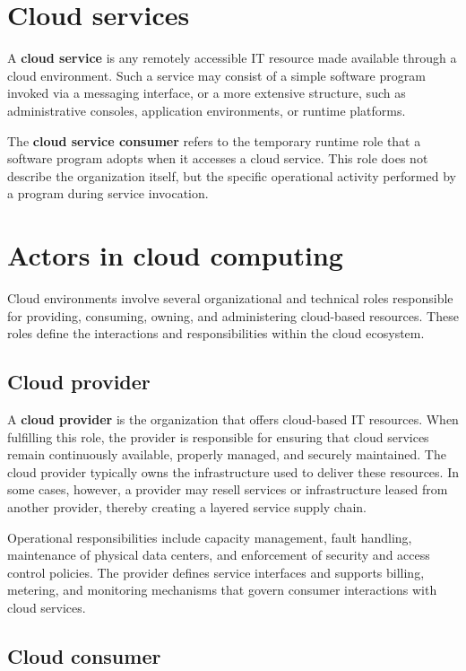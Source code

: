\documentclass[11pt,a4paper,openany]{report}
\begin{document}
\section{Cloud services}

A \textbf{cloud service} is any remotely accessible IT resource made available through a cloud environment. Such a service may consist of a simple software program invoked via a messaging interface, or a more extensive structure, such as administrative consoles, application environments, or runtime platforms.

The \textbf{cloud service consumer} refers to the temporary runtime role that a software program adopts when it accesses a cloud service. This role does not describe the organization itself, but the specific operational activity performed by a program during service invocation.

\section{Actors in cloud computing}

Cloud environments involve several organizational and technical roles responsible for providing, consuming, owning, and administering cloud-based resources. These roles define the interactions and responsibilities within the cloud ecosystem.

\subsection{Cloud provider}

A \textbf{cloud provider} is the organization that offers cloud-based IT resources. When fulfilling this role, the provider is responsible for ensuring that cloud services remain continuously available, properly managed, and securely maintained. The cloud provider typically owns the infrastructure used to deliver these resources. In some cases, however, a provider may resell services or infrastructure leased from another provider, thereby creating a layered service supply chain.

Operational responsibilities include capacity management, fault handling, maintenance of physical data centers, and enforcement of security and access control policies. The provider defines service interfaces and supports billing, metering, and monitoring mechanisms that govern consumer interactions with cloud services.

\subsection{Cloud consumer}
\end{document}
